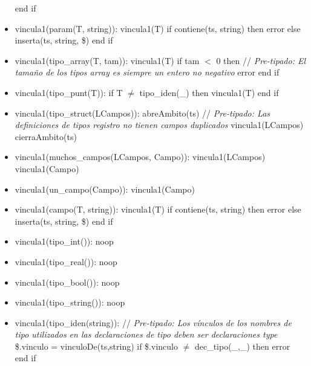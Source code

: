 \documentclass[11pt]{article}
\begin{document}
\begin{itemize}
                    \subitem end if
                \item vincula1(param(T, string)): 
                    \subitem vincula1(T) 
                    \subitem if contiene(ts, string) then 
                        \subsubitem error 
                    \subitem else 
                        \subsubitem inserta(ts, string, \$) 
                    \subitem end if
                \item vincula1(tipo\_array(T, tam)): 
                    \subitem vincula1(T) 
                    \subitem if tam $<$ 0 then \/// \textit{Pre-tipado: El tamaño de los tipos array es siempre un entero no negativo}
                        \subsubitem error 
                    \subitem end if
                \item vincula1(tipo\_punt(T)): 
                    \subitem if T $\neq$ tipo\_iden(\_) then 
                        \subsubitem vincula1(T)
                    \subitem end if
                \item vincula1(tipo\_struct(LCampos)): 
                    \subitem abreAmbito(ts)  \/// \textit{Pre-tipado: Las definiciones de tipos registro no tienen campos duplicados}
                    \subitem vincula1(LCampos)
                    \subitem cierraAmbito(ts)
                \item vincula1(muchos\_campos(LCampos, Campo)): 
                    \subitem vincula1(LCampos) 
                    \subitem vincula1(Campo)
                \item vincula1(un\_campo(Campo)): 
                    \subitem vincula1(Campo)
                \item vincula1(campo(T, string)): 
                    \subitem vincula1(T)
                    \subitem if contiene(ts, string) then
                        \subsubitem error
                    \subitem else
                        \subsubitem inserta(ts, string, \$)
                    \subitem end if
                \item vincula1(tipo\_int()): 
                    \subitem noop 
                \item vincula1(tipo\_real()): 
                    \subitem noop
                \item vincula1(tipo\_bool()): 
                    \subitem noop
                \item vincula1(tipo\_string()): 
                    \subitem noop
                \item vincula1(tipo\_iden(string)):  \/// \textit{Pre-tipado: Los vínculos de los nombres de tipo utilizados en las declaraciones de tipo deben ser declaraciones type}                   \subitem \$.vinculo = vinculoDe(ts,string)
                    \subitem if \$.vinculo $\neq$ dec\_tipo(\_,\_) then
                        \subsubitem error
                    \subitem end if
            \end{itemize}
\end{document}
